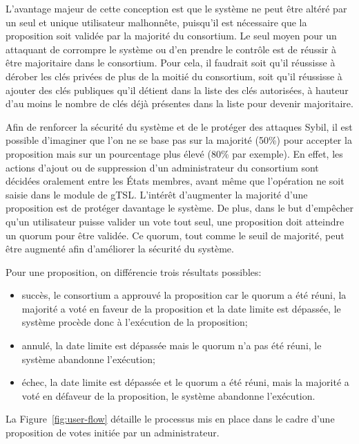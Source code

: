 \documentclass{tnreport}
\begin{document}
L'avantage majeur de cette conception est que le système ne peut être altéré par un seul et unique utilisateur malhonnête, puisqu'il est nécessaire que la proposition soit validée par la majorité du consortium. Le seul moyen pour un attaquant de corrompre le système ou d'en prendre le contrôle est de réussir à être majoritaire dans le consortium. Pour cela, il faudrait soit qu'il réussisse à dérober les clés privées de plus de la moitié du consortium, soit qu'il réussisse à ajouter des clés publiques qu'il détient dans la liste des clés autorisées, à hauteur d'au moins le nombre de clés déjà présentes dans la liste pour devenir majoritaire. 

Afin de renforcer la sécurité du système et de le protéger des attaques Sybil, il est possible d'imaginer que l'on ne se base pas sur la majorité (50\%) pour accepter la proposition mais sur un pourcentage plus élevé (80\% par exemple). En effet, les actions d'ajout ou de suppression d'un administrateur du consortium sont décidées oralement entre les États membres, avant même que l'opération ne soit saisie dans le module de gTSL. L'intérêt d'augmenter la majorité d'une proposition est de protéger davantage le système. De plus, dans le but d'empêcher qu'un utilisateur puisse valider un vote tout seul, une proposition doit atteindre un quorum pour être validée. Ce quorum, tout comme le seuil de majorité, peut être augmenté afin d'améliorer la sécurité du système.

Pour une proposition, on différencie trois résultats possibles:
\begin{itemize}
	\item succès, le consortium a approuvé la proposition car le quorum a été réuni, la majorité a voté en faveur de la proposition et la date limite est dépassée, le système procède donc à l'exécution de la proposition;
	\item annulé, la date limite est dépassée mais le quorum n'a pas été réuni, le système abandonne l'exécution;
	\item échec, la date limite est dépassée et le quorum a été réuni, mais la majorité a voté en défaveur de la proposition, le système abandonne l'exécution.
	\newline
\end{itemize}

La Figure~\ref{fig:user-flow} détaille le processus mis en place dans le cadre d'une proposition de votes initiée par un administrateur.
\end{document}
